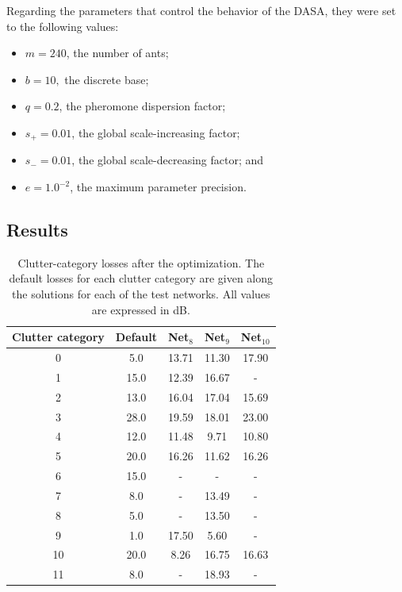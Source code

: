 Regarding the parameters that control the behavior of the DASA, they
were set to the following values:
\begin{itemize}
\item $m=240$, the number of ants;
\item $b=10,$ the discrete base;
\item $q=0.2$, the pheromone dispersion factor;
\item $s_{+}=0.01$, the global scale-increasing factor;
\item $s_{-}=0.01$, the global scale-decreasing factor; and 
\item $e=1.0^{-2}$, the maximum parameter precision.
\end{itemize}

\subsection{Results}

\begin{table}
\centering

\caption{Clutter-category losses after the optimization. The default losses
for each clutter category are given along the solutions for each of
the test networks. All values are expressed in dB. \label{tab:05-Clutter_optimization_solutions}}


{\small{}}%
\begin{tabular}{ccccc}
\hline 
{\small{Clutter category}} & {\small{Default}} & {\small{Net$_{8}$}} & {\small{Net$_{9}$}} & {\small{Net$_{10}$}}\tabularnewline
\hline 
{\small{0}} & {\small{5.0}} & {\small{13.71}} & {\small{11.30}} & {\small{17.90}}\tabularnewline
{\small{1}} & {\small{15.0}} & {\small{12.39}} & {\small{16.67}} & {\small{-}}\tabularnewline
{\small{2}} & {\small{13.0}} & {\small{16.04}} & {\small{17.04}} & {\small{15.69}}\tabularnewline
{\small{3}} & {\small{28.0}} & {\small{19.59}} & {\small{18.01}} & {\small{23.00}}\tabularnewline
{\small{4}} & {\small{12.0}} & {\small{11.48}} & {\small{9.71}} & {\small{10.80}}\tabularnewline
{\small{5}} & {\small{20.0}} & {\small{16.26}} & {\small{11.62}} & {\small{16.26}}\tabularnewline
{\small{6}} & {\small{15.0}} & {\small{-}} & {\small{-}} & {\small{-}}\tabularnewline
{\small{7}} & {\small{8.0}} & {\small{-}} & {\small{13.49}} & {\small{-}}\tabularnewline
{\small{8}} & {\small{5.0}} & {\small{-}} & {\small{13.50}} & {\small{-}}\tabularnewline
{\small{9}} & {\small{1.0}} & {\small{17.50}} & {\small{5.60}} & {\small{-}}\tabularnewline
{\small{10}} & {\small{20.0}} & {\small{8.26}} & {\small{16.75}} & {\small{16.63}}\tabularnewline
{\small{11 }} & {\small{8.0}} & {\small{-}} & {\small{18.93}} & {\small{-}}\tabularnewline
\hline 
\end{tabular}
\end{table}


